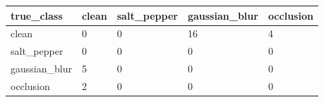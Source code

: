 \begin{tabular}{lllll}
\hline
true\_class & clean & salt\_pepper & gaussian\_blur & occlusion \\
\hline
clean & 0 & 0 & 16 & 4 \\
salt\_pepper & 0 & 0 & 0 & 0 \\
gaussian\_blur & 5 & 0 & 0 & 0 \\
occlusion & 2 & 0 & 0 & 0 \\
\hline
\end{tabular}
